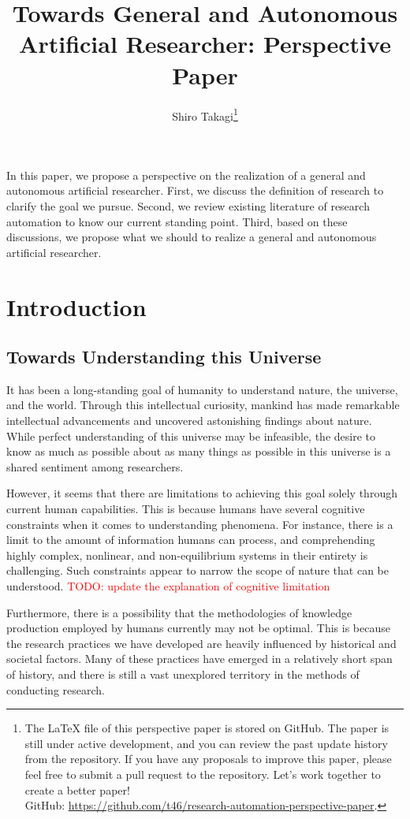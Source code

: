 \documentclass{book}
\title{Towards General and Autonomous Artificial Researcher: Perspective Paper}
\author{Shiro Takagi\footnote{The LaTeX file of this perspective paper is stored on GitHub. The paper is still under active development, and you can review the past update history from the repository. If you have any proposals to improve this paper, please feel free to submit a pull request to the repository. Let's work together to create a better paper! \\ GitHub: \url{https://github.com/t46/research-automation-perspective-paper}. }}
\newenvironment{abstract}{}{}
\begin{document}
\sloppy
\maketitle
\tableofcontents

\begin{abstract}
    In this paper, we propose a perspective on the realization of a general and autonomous artificial researcher. First, we discuss the definition of research to clarify the goal we pursue. Second, we review existing literature of research automation to know our current standing point. Third, based on these discussions, we propose what we should to realize a general and autonomous artificial researcher.
\end{abstract}

\chapter{Introduction}

\section{Towards Understanding this Universe}
It has been a long-standing goal of humanity to understand nature, the universe, and the world. Through this intellectual curiosity, mankind has made remarkable intellectual advancements and uncovered astonishing findings about nature. While perfect understanding of this universe may be infeasible, the desire to know as much as possible about as many things as possible in this universe is a shared sentiment among researchers.

However, it seems that there are limitations to achieving this goal solely through current human capabilities. This is because humans have several cognitive constraints when it comes to understanding phenomena. For instance, there is a limit to the amount of information humans can process, and comprehending highly complex, nonlinear, and non-equilibrium systems in their entirety is challenging. Such constraints appear to narrow the scope of nature that can be understood. \textcolor{red}{TODO: update the explanation of cognitive limitation}

Furthermore, there is a possibility that the methodologies of knowledge production employed by humans currently may not be optimal. This is because the research practices we have developed are heavily influenced by historical and societal factors. Many of these practices have emerged in a relatively short span of history, and there is still a vast unexplored territory in the methods of conducting research.
\end{document}
